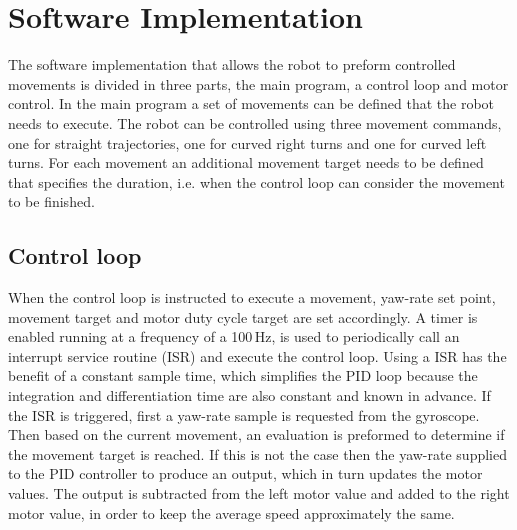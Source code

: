 


\section{Software Implementation}
\label{sec:dai_software_implementation}

The software implementation that allows the robot to preform controlled movements is divided in three parts, the main program, a control loop and motor control.
In the main program a set of movements can be defined that the robot needs to execute.
The robot can be controlled using three movement commands, one for straight trajectories, one for curved right turns and one for curved left turns.
For each movement an additional movement target needs to be defined that specifies the duration, i.e. when the control loop can consider the movement to be finished.

\subsection{Control loop}

When the control loop is instructed to execute a movement, yaw-rate set point, movement target and motor duty cycle target are set accordingly.
A timer is enabled running at a frequency of a 100\,Hz, is used to periodically call an interrupt service routine (ISR) and execute the control loop.
Using a ISR has the benefit of a constant sample time, which simplifies the PID loop because the integration and differentiation time are also constant and known in advance.
If the ISR is triggered, first a yaw-rate sample is requested from the gyroscope.
Then based on the current movement, an evaluation is preformed to determine if the movement target is reached.
If this is not the case then the yaw-rate supplied to the PID controller to produce an output, which in turn updates the motor values.
The output is subtracted from the left motor value and added to the right motor value, in order to keep the average speed approximately the same.

